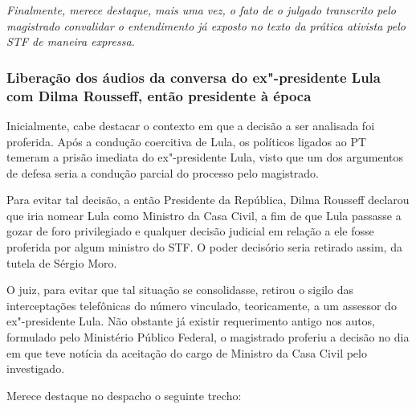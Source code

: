 {\emph{Finalmente, merece destaque, mais uma vez, o fato de o julgado
transcrito pelo magistrado convalidar o entendimento já exposto no texto
da prática ativista pelo STF de maneira expressa. }

\subsubsection{Liberação dos áudios da conversa do ex"-presidente Lula
com Dilma Rousseff, então presidente à época}

Inicialmente, cabe destacar o contexto em que a decisão a ser analisada
foi proferida. Após a condução coercitiva de Lula, os políticos ligados
ao PT temeram a prisão imediata do ex"-presidente Lula, visto que um dos
argumentos de defesa seria a condução parcial do processo pelo
magistrado.

Para evitar tal decisão, a então Presidente da República, Dilma Rousseff
declarou que iria nomear Lula como Ministro da Casa Civil, a fim de que
Lula passasse a gozar de foro privilegiado e qualquer decisão judicial
em relação a ele fosse proferida por algum ministro do STF. O poder
decisório seria retirado assim, da tutela de Sérgio Moro.

O juiz, para evitar que tal situação se consolidasse, retirou o sigilo
das interceptações telefônicas do número vinculado, teoricamente, a um
assessor do ex"-presidente Lula. Não obstante já existir requerimento
antigo nos autos, formulado pelo Ministério Público Federal, o
magistrado proferiu a decisão no dia em que teve notícia da aceitação do
cargo de Ministro da Casa Civil pelo investigado.

Merece destaque no despacho o seguinte trecho:

}
